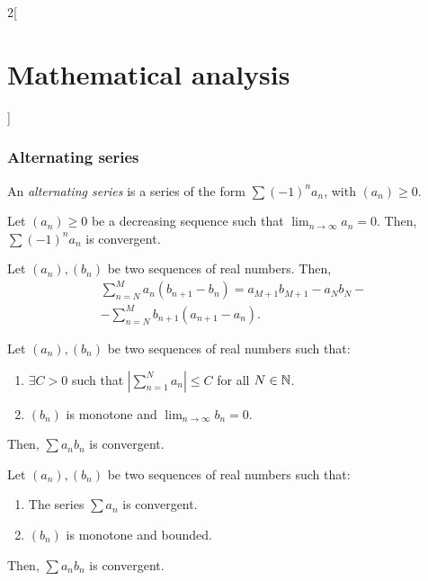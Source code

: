 \documentclass[../../../main.tex]{subfiles}
\begin{document}
\begin{multicols}{2}[\section{Mathematical analysis}]
\subsubsection*{Alternating series}
\begin{definition}
An \textit{alternating series} is a series of the form $\sum (-1)^na_n$, with $(a_n)\geq 0$.
\end{definition}
\begin{theorem}
Let $(a_n)\geq 0$ be a decreasing sequence such that $\displaystyle\lim_{n\to\infty}a_n=0$. Then, $\sum (-1)^na_n$ is convergent.
\end{theorem}
\begin{theorem}
Let $(a_n),(b_n)$ be two sequences of real numbers. Then, 
\begin{multline*}
\sum_{n=N}^M a_n(b_{n+1}-b_n)=a_{M+1}b_{M+1}-a_Nb_N-\\
-\sum_{n=N}^Mb_{n+1}(a_{n+1}-a_n).
\end{multline*}
\end{theorem}
\begin{theorem}
Let $(a_n),(b_n)$ be two sequences of real numbers such that:
\begin{enumerate}
    \item $\exists C>0$ such that $\displaystyle\left|\sum_{n=1}^Na_n\right|\leq C$ for all $N\in\mathbb{N} $.
    \item $(b_n)$ is monotone and $\displaystyle\lim_{n\to\infty}b_n=0$.
\end{enumerate}
Then, $\sum a_nb_n$ is convergent.
\end{theorem}
\begin{theorem}
Let $(a_n),(b_n)$ be two sequences of real numbers such that:
\begin{enumerate}
    \item The series $\sum a_n$ is convergent.
    \item $(b_n)$ is monotone and bounded.
\end{enumerate}
Then, $\sum a_nb_n$ is convergent.
\end{theorem}

\end{multicols}
\end{document}
